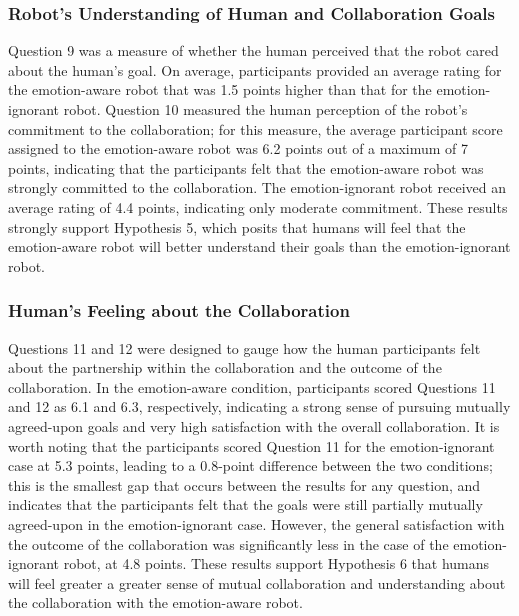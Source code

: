 \documentclass{sig-alternate-05-2015}
\begin{document}
\subsubsection{Robot's Understanding of Human and Collaboration Goals}
\label{sec:Goals}
Question 9 was a measure of whether the human perceived that the robot cared
about the human's goal. On average, participants provided an average rating for
the emotion-aware robot that was 1.5 points higher than that for the
emotion-ignorant robot. Question 10 measured the human perception of the
robot's commitment to the collaboration; for this measure, the average
participant score assigned to the emotion-aware robot was 6.2 points out of a
maximum of 7 points, indicating that the participants felt that the
emotion-aware robot was strongly committed to the collaboration. The
emotion-ignorant robot received an average rating of 4.4 points, indicating
only moderate commitment. These results strongly support Hypothesis 5, which
posits that humans will feel that the emotion-aware robot will better understand
their goals than the emotion-ignorant robot. 

\subsubsection{Human's Feeling about the Collaboration}
\label{sec:Collaboration}
Questions 11 and 12 were designed to gauge how the human participants felt
about the partnership within the collaboration and the outcome of the
collaboration. In the emotion-aware condition, participants scored Questions 11
and 12 as 6.1 and 6.3, respectively, indicating a strong sense of pursuing
mutually agreed-upon goals and very high satisfaction with the overall
collaboration. It is worth noting that the participants scored Question 11 for
the emotion-ignorant case at 5.3 points, leading to a 0.8-point difference
between the two conditions; this is the smallest gap that occurs between the
results for any question, and indicates that the participants felt that the
goals were still partially mutually agreed-upon in the emotion-ignorant case.
However, the general satisfaction with the outcome of the collaboration was
significantly less in the case of the emotion-ignorant robot, at 4.8 points.
These results support Hypothesis 6 that humans will feel greater a greater sense
of mutual collaboration and understanding about the collaboration with the
emotion-aware robot.
\end{document}
